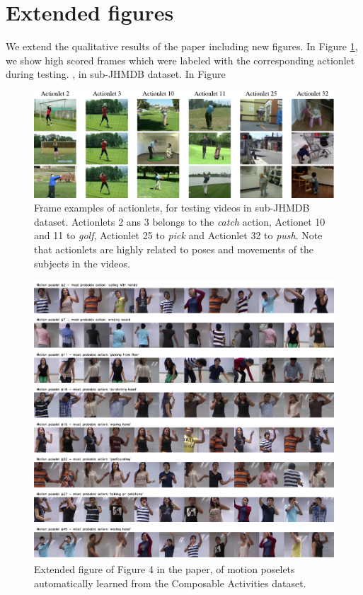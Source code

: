 \documentclass[10pt,letterpaper]{article}
\newcommand{\+}[1]{\ensuremath{{\boldsymbol #1}}}
\begin{document}
\section{Extended figures}

We extend the qualitative results of the paper including new figures. In Figure \ref{fig_actionlets}, we show high scored frames which were labeled with the corresponding actionlet during testing. , in sub-JHMDB dataset. In Figure

\begin{figure}[tb]
\begin{center}
\includegraphics[width=0.999\linewidth]{../Fig/fig_actionlets_subJHMDB.pdf}
\end{center}
\caption{Frame examples of actionlets, for testing videos in sub-JHMDB dataset. Actionlets 2 ans 3 belongs to the \textit{catch} action, Actionet 10 and 11 to \emph{golf}, Actionlet 25 to \emph{pick} and Actionlet 32 to \emph{push}. Note that actionlets are highly related to poses and movements of the subjects in the videos.  }
\label{fig_actionlets}
\end{figure}

\begin{figure}[tb]
\begin{center}
\includegraphics[width=0.999\linewidth]{../Fig/fig_poses_complete.pdf}
\end{center}
\caption{Extended figure of Figure 4 in the paper, of motion poselets automatically learned from the Composable Activities dataset.  }
\label{fig_poses}
\end{figure}
\end{document}
